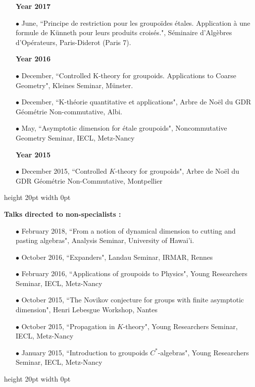 \documentclass[a4paper,11pt]{article}
\newcommand\espace{\vrule height 20pt width 0pt}
\begin{document}
\begin{itemize}
\item[\textbf{Year 2017}]
\item[$\bullet$] June, ``Principe de restriction pour les groupoïdes étales. Application à une formule de Künneth pour leurs produits croisés.", Séminaire d'Algèbres d'Opérateurs, Paris-Diderot (Paris 7).
\end{itemize}

\begin{itemize}
\item[\textbf{Year 2016}]
\item[$\bullet$] December, ``Controlled K-theory for groupoids. Applications to Coarse Geometry", Kleines Seminar, Münster.
\item[$\bullet$] December, ``K-théorie quantitative et applications", Arbre de Noël du GDR Géométrie Non-commutative, Albi.
\item[$\bullet$] May, ``Asymptotic dimension for étale groupoids", Noncommutative Geometry Seminar, IECL, Metz-Nancy
\end{itemize}

\begin{itemize}
\item[\textbf{Year 2015}]
\item[$\bullet$] December 2015, ``Controlled $K$-theory for groupoids", Arbre de Noël du GDR Géométrie Non-Commutative, Montpellier
\end{itemize}
\espace

\textbf{Talks directed to non-specialists :}\\

\begin{itemize}
\item[$\bullet$] February 2018, ``From a notion of dynamical dimension to cutting and pasting algebras", Analysis Seminar, University of Hawai'i.
\item[$\bullet$] October 2016, ``Expanders", Landau Seminar, IRMAR, Rennes %
\item[$\bullet$] February 2016, ``Applications of groupoids to Physics", Young Researchers Seminar, IECL, Metz-Nancy
\item[$\bullet$] October 2015, ``The Novikov conjecture for groups with finite asymptotic dimension", Henri Lebesgue Workshop, Nantes
\item[$\bullet$] October 2015, ``Propagation in $K$-theory", Young Researchers Seminar, IECL, Metz-Nancy
\item[$\bullet$] January 2015, ``Introduction to groupoids $C^*$-algebras", Young Researchers Seminar, IECL, Metz-Nancy
\end{itemize}
\espace
\end{document}

